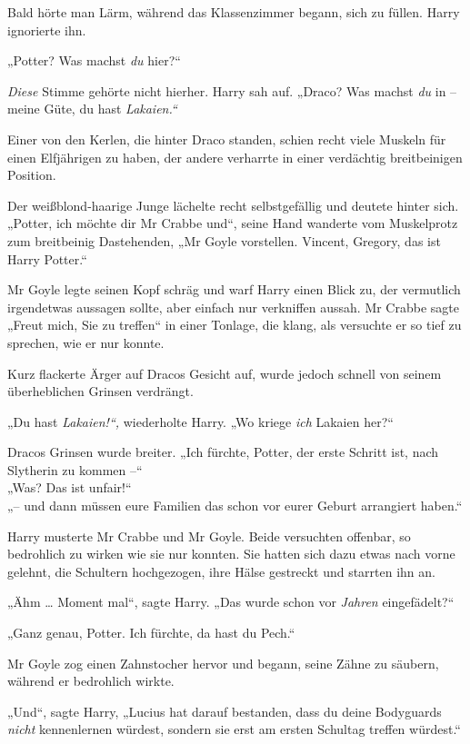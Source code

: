 {Bald hörte man Lärm, während das Klassenzimmer begann, sich zu füllen. Harry ignorierte ihn.

„Potter? Was machst \emph{du} hier?“

\emph{Diese} Stimme gehörte nicht hierher. Harry sah auf. „Draco? Was machst \emph{du} in -- meine Güte, du hast \emph{Lakaien.“}

Einer von den Kerlen, die hinter Draco standen, schien recht viele Muskeln für einen Elfjährigen zu haben, der andere verharrte in einer verdächtig breitbeinigen Position.

Der weißblond-haarige Junge lächelte recht selbstgefällig und deutete hinter sich. „Potter, ich möchte dir Mr Crabbe und“, seine Hand wanderte vom Muskelprotz zum breitbeinig Dastehenden, „Mr Goyle vorstellen. Vincent, Gregory, das ist Harry Potter.“

Mr Goyle legte seinen Kopf schräg und warf Harry einen Blick zu, der vermutlich irgendetwas aussagen sollte, aber einfach nur verkniffen aussah. Mr Crabbe sagte „Freut mich, Sie zu treffen“ in einer Tonlage, die klang, als versuchte er so tief zu sprechen, wie er nur konnte.

Kurz flackerte Ärger auf Dracos Gesicht auf, wurde jedoch schnell von seinem überheblichen Grinsen verdrängt.

„Du hast \emph{Lakaien!“,} wiederholte Harry. „Wo kriege \emph{ich} Lakaien her?“

Dracos Grinsen wurde breiter. „Ich fürchte, Potter, der erste Schritt ist, nach Slytherin zu kommen --“\\ „Was? Das ist unfair!“\\ „-- und dann müssen eure Familien das schon vor eurer Geburt arrangiert haben.“

Harry musterte Mr Crabbe und Mr Goyle. Beide versuchten offenbar, so bedrohlich zu wirken wie sie nur konnten. Sie hatten sich dazu etwas nach vorne gelehnt, die Schultern hochgezogen, ihre Hälse gestreckt und starrten ihn an.

„Ähm … Moment mal“, sagte Harry. „Das wurde schon vor \emph{Jahren} eingefädelt?“

„Ganz genau, Potter. Ich fürchte, da hast du Pech.“

Mr Goyle zog einen Zahnstocher hervor und begann, seine Zähne zu säubern, während er bedrohlich wirkte.

„Und“, sagte Harry, „Lucius hat darauf bestanden, dass du deine Bodyguards \emph{nicht} kennenlernen würdest, sondern sie erst am ersten Schultag treffen würdest.“

}
